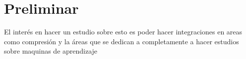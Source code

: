 \section{Preliminar}
\label{sec:preliminar}

El interés en hacer un estudio sobre esto es poder hacer integraciones en areas como compresión y la áreas que se dedican a completamente a hacer estudios sobre maquinas de aprendizaje